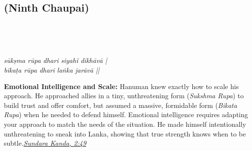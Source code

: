 
\newpage

\subsection*{ (Ninth Chaupai)}

\begin{minipage}[t]{0.55\textwidth}
\vspace{0pt}

{\large \linespread{1.5}\selectfont
{}\\
\par}

\vspace{0.5em}

{\large \linespread{1.5}\selectfont
{}\\
\par}

\vspace{0.5em}

{\large \linespread{1.3}\selectfont
\textit{sūkṣma rūpa dhari siyahĩ dikhāvā |}\\
\textit{bikaṭa rūpa dhari laṅka jarāvā ||}
\par}
\end{minipage}%
\hfill
\begin{minipage}[t]{0.42\textwidth}
\vspace{0pt}
\begin{tcolorbox}[anchorbox]
\textbf{Emotional Intelligence and Scale:} Hanuman knew exactly how to scale his approach. He approached allies in a tiny, unthreatening form (\textit{Sukshma Rupa}) to build trust and offer comfort, but assumed a massive, formidable form (\textit{Bikata Rupa}) when he needed to defend himself. Emotional intelligence requires adapting your approach to match the needs of the situation.
\vspace{0.5em}\newline He made himself intentionally unthreatening to sneak into Lanka, showing that true strength knows when to be subtle.\newline\null\hfill\href{https://www.valmiki.iitk.ac.in/sloka?field_kanda_tid=5&language=dv&field_sarga_value=2}{\textit{Sundara Kanda, 2:49}}
\end{tcolorbox}
\end{minipage}


